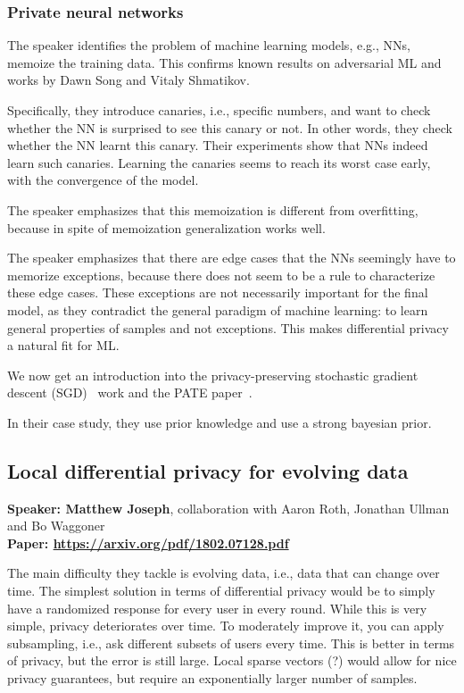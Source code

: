 \documentclass{article}
\begin{document}
\subsubsection{Private neural networks}
The speaker identifies the problem of machine learning models, e.g., NNs, memoize the training data. This confirms known results on adversarial ML and works by Dawn Song and Vitaly Shmatikov.

Specifically, they introduce canaries, i.e., specific numbers, and want to check whether the NN is surprised to see this canary or not. In other words, they check whether the NN learnt this canary. Their experiments show that NNs indeed learn such canaries. Learning the canaries seems to reach its worst case early, with the convergence of the model.

The speaker emphasizes that this memoization is different from overfitting, because in spite of memoization generalization works well.

The speaker emphasizes that there are edge cases that the NNs seemingly have to memorize exceptions, because there does not seem to be a rule to characterize these edge cases. These exceptions are not necessarily important for the final model, as they contradict the general paradigm of machine learning: to learn general properties of samples and not exceptions. This makes differential privacy a natural fit for ML.

We now get an introduction into the privacy-preserving stochastic gradient descent (SGD)~\cite{abadiSGD} work and the PATE paper~\cite{PATE}.

In their case study, they use prior knowledge and use a strong bayesian prior.



\subsection{Local differential privacy for evolving data}
\noindent\textbf{Speaker: Matthew Joseph}, collaboration with Aaron Roth, Jonathan Ullman and Bo Waggoner\\
\noindent\textbf{Paper: \url{https://arxiv.org/pdf/1802.07128.pdf}}

The main difficulty they tackle is evolving data, i.e., data that can change over time. The simplest solution in terms of differential privacy would be to simply have a randomized response for every user in every round. While this is very simple, privacy deteriorates over time. To moderately improve it, you can apply subsampling, i.e., ask different subsets of users every time. This is better in terms of privacy, but the error is still large.
Local sparse vectors (?) would allow for nice privacy guarantees, but require an exponentially larger number of samples.
\end{document}
